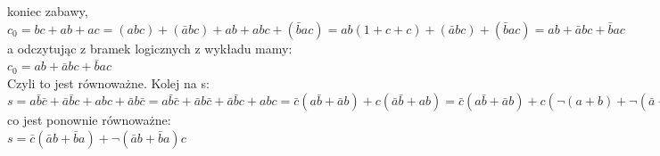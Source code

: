 \documentclass{article}
\begin{document}
koniec zabawy,\\
$c_0=bc+ab+ac = (abc) + (\bar abc) +ab + abc + (\bar bac) = ab(1 + c + c) + (\bar abc) +(\bar bac) = ab + \bar{a}bc + \bar{b}ac $\\
a odczytując z bramek logicznych z wykładu mamy:\\
$c_0 = ab + \bar{a}bc + \bar{b}ac $\\
Czyli to jest równoważne. Kolej na s:\\
$s=a\bar{b}\bar{c} + \bar{a}\bar{b}c + abc + \bar{a}b\bar{c}=a\bar{b}\bar{c}+ \bar{a}b\bar{c} + \bar{a}\bar{b}c + abc = \bar{c}(a\bar{b}+ \bar{a}b)+ c(\bar{a}\bar{b} + ab) = \bar{c}(a\bar{b}+ \bar{a}b)+ c(\neg(a+b) +\neg(\bar{a}+\bar{b}))=\bar{c}(a\bar{b}+ \bar{a}b)+ c\neg((a+b)(\bar{a}+\bar{b}))=\bar c(\bar{a}b + \bar{b}a) + \neg(\bar{a}b + \bar{b}a)c$\\
co jest ponownie równoważne:\\
$s=\bar c(\bar{a}b + \bar{b}a) + \neg(\bar{a}b + \bar{b}a)c$
\end{document}
